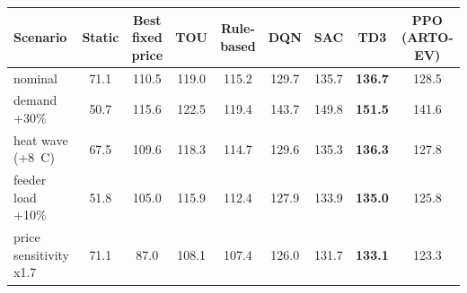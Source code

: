 \begin{tabular}{@{}lcccccccc@{}}
\toprule
Scenario & Static & Best fixed price & TOU & Rule-based & DQN & SAC & TD3 & PPO (ARTO-EV) \\
\midrule
nominal & 71.1 & 110.5 & 119.0 & 115.2 & 129.7 & 135.7 & \textbf{136.7} & 128.5 \\
demand +30\% & 50.7 & 115.6 & 122.5 & 119.4 & 143.7 & 149.8 & \textbf{151.5} & 141.6 \\
heat wave (+8~\textdegree{}C) & 67.5 & 109.6 & 118.3 & 114.7 & 129.6 & 135.3 & \textbf{136.3} & 127.8 \\
feeder load +10\% & 51.8 & 105.0 & 115.9 & 112.4 & 127.9 & 133.9 & \textbf{135.0} & 125.8 \\
price sensitivity x1.7 & 71.1 & 87.0 & 108.1 & 107.4 & 126.0 & 131.7 & \textbf{133.1} & 123.3 \\
\bottomrule
\end{tabular}